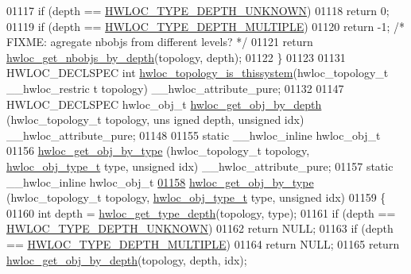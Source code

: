\begin{DoxyCode}
01117         \textcolor{keywordflow}{if} (depth == \hyperlink{a00046_ggaf4e663cf42bbe20756b849c6293ef575a0565ab92ab72cb0cec91e23003294aad}{HWLOC_TYPE_DEPTH_UNKNOWN})
01118                 \textcolor{keywordflow}{return} 0;
01119         \textcolor{keywordflow}{if} (depth == \hyperlink{a00046_ggaf4e663cf42bbe20756b849c6293ef575ae99465995cacde6c210d5fc2e409798c}{HWLOC_TYPE_DEPTH_MULTIPLE})
01120                 \textcolor{keywordflow}{return} -1; \textcolor{comment}{/* FIXME: agregate nbobjs from different levels? */}
01121         \textcolor{keywordflow}{return} \hyperlink{a00046_ga20cfe2456f4cfdd789c9aca6d2fdd69f}{hwloc_get_nbobjs_by_depth}(topology, depth);
01122 \}
01123 
01131 HWLOC\_DECLSPEC \textcolor{keywordtype}{int} \hyperlink{a00046_ga0d109e33fc7990f62f665d336e5e5111}{hwloc_topology_is_thissystem}(hwloc\_topology\_t  \_\_hwloc\_restric
      t topology) \_\_hwloc\_attribute\_pure;
01132 
01147 HWLOC\_DECLSPEC hwloc\_obj\_t \hyperlink{a00047_gaedd78240b0c1108355586a268ec5a697}{hwloc_get_obj_by_depth} (hwloc\_topology\_t topology, \textcolor{keywordtype}{uns
      igned} depth, \textcolor{keywordtype}{unsigned} idx) \_\_hwloc\_attribute\_pure;
01148 
01155 \textcolor{keyword}{static} \_\_hwloc\_inline hwloc\_obj\_t
01156 \hyperlink{a00047_ga9be4a03488cdd0fb431e4aa1cbdea895}{hwloc_get_obj_by_type} (hwloc\_topology\_t topology, \hyperlink{a00041_gacd37bb612667dc437d66bfb175a8dc55}{hwloc_obj_type_t} type, \textcolor{keywordtype}{unsigned
      } idx) \_\_hwloc\_attribute\_pure;
01157 \textcolor{keyword}{static} \_\_hwloc\_inline hwloc\_obj\_t
\hypertarget{a00033_source_l01158}{}\hyperlink{a00047_ga9be4a03488cdd0fb431e4aa1cbdea895}{01158} \hyperlink{a00047_ga9be4a03488cdd0fb431e4aa1cbdea895}{hwloc_get_obj_by_type} (hwloc\_topology\_t topology, \hyperlink{a00041_gacd37bb612667dc437d66bfb175a8dc55}{hwloc_obj_type_t} type, \textcolor{keywordtype}{unsigned
      } idx)
01159 \{
01160   \textcolor{keywordtype}{int} depth = \hyperlink{a00046_gaea7c64dd59467f5201ba87712710b14d}{hwloc_get_type_depth}(topology, type);
01161   \textcolor{keywordflow}{if} (depth == \hyperlink{a00046_ggaf4e663cf42bbe20756b849c6293ef575a0565ab92ab72cb0cec91e23003294aad}{HWLOC_TYPE_DEPTH_UNKNOWN})
01162     \textcolor{keywordflow}{return} NULL;
01163   \textcolor{keywordflow}{if} (depth == \hyperlink{a00046_ggaf4e663cf42bbe20756b849c6293ef575ae99465995cacde6c210d5fc2e409798c}{HWLOC_TYPE_DEPTH_MULTIPLE})
01164     \textcolor{keywordflow}{return} NULL;
01165   \textcolor{keywordflow}{return} \hyperlink{a00047_gaedd78240b0c1108355586a268ec5a697}{hwloc_get_obj_by_depth}(topology, depth, idx);

\end{DoxyCode}

